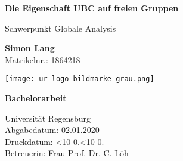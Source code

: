 \documentclass[a4paper,10pt]{scrreprt}
\newcommand{\leadingzero}[1]{\ifnum #1<10 0\the#1\else\the#1\fi}
\newcommand{\todayA}{\leadingzero{\day}.\leadingzero{\month}.\the\year}
\begin{document}
\begin{titlepage}
    \begin{center}
        \vspace*{1cm}
 
        \Huge
        \textbf{Die Eigenschaft UBC auf freien Gruppen}
 
        \vspace{0.5cm}
        \LARGE
        Schwerpunkt Globale Analysis
 
        \vspace{1.5cm}
 
        \textbf{Simon Lang}\\
        \large 
        Matrikelnr.: 1864218
 		
 		\vfill
         \texttt{[image: ur-logo-bildmarke-grau.png]}
 
        \vfill
 		\LARGE
        \textbf{Bachelorarbeit}

        \vspace{0.8cm}
 
        \Large
        Universität Regensburg\\
        Abgabedatum: 02.01.2020\\
        Druckdatum: \todayA\\
        Betreuerin: Frau Prof. Dr. C. Löh
 
    \end{center}
\end{titlepage}
\end{document}
